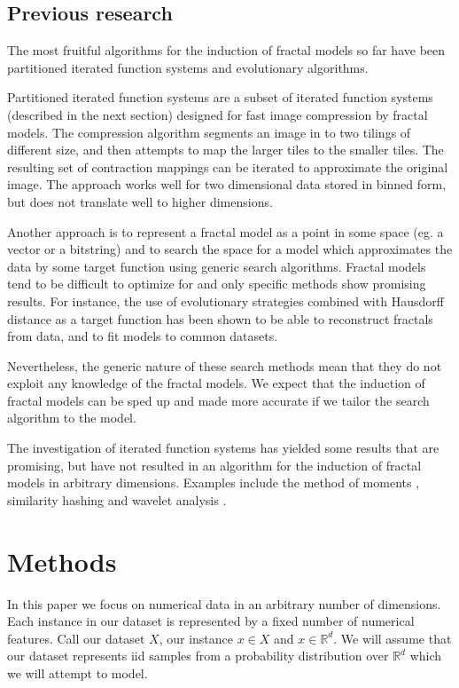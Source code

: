 \documentclass[10pt,a4paper,oneside]{article}
\theoremstyle{definition}
\begin{document}
\subsection*{Previous research}

The most fruitful algorithms for the induction of fractal models so far have been partitioned iterated function systems and evolutionary algorithms. 

Partitioned iterated function systems \cite{hart1996fractal} are a subset of iterated function systems (described in the next section) designed for fast image compression by fractal models. The compression algorithm segments an image in to two tilings of different size, and then attempts to map the larger tiles to the smaller tiles. The resulting set of contraction mappings can be iterated to approximate the original image. The approach works well for two dimensional data stored in binned form, but does not translate well to higher dimensions.

Another approach is to represent a fractal model as a point in some space (eg. a vector or a bitstring) and to search the space for a model which approximates the data by some target function using generic search algorithms. Fractal models tend to be difficult to optimize for and only specific methods show promising results. For instance, the use of evolutionary strategies combined with Hausdorff distance as a target function has been shown to be able to reconstruct fractals from data, and to fit models to common datasets.  

Nevertheless, the generic nature of these search methods mean that they do not exploit any knowledge of the fractal models. We expect that the induction of fractal models can be sped up and made more accurate if we tailor the search algorithm to the model.

The investigation of iterated function systems has yielded some results that are promising, but have not resulted in an algorithm for the induction of fractal models in arbitrary dimensions. Examples include the method of moments \cite{rinaldo1994inverse}, similarity hashing \cite{hart1997similarity} and wavelet analysis \cite{struzik1996coastline}.

\section*{Methods}

In this paper we focus on numerical data in an arbitrary number of dimensions. Each instance in our dataset is represented by a fixed number of numerical features. Call our dataset $X$, our instance $x \in X$ and $x \in {\mathbb R}^d$. We will assume that our dataset represents iid samples from a probability distribution over ${\mathbb R}^d$ which we will attempt to model.
\end{document}

